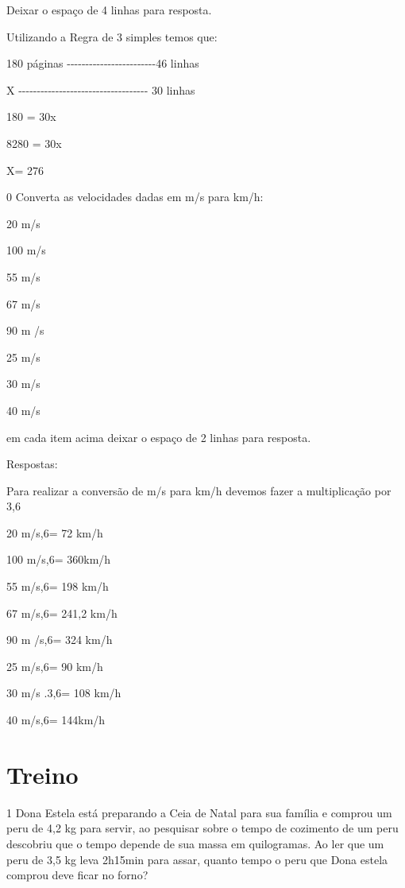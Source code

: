 Deixar o espaço de 4 linhas para resposta.

Utilizando a Regra de 3 simples temos que:

180 páginas
-\/-\/-\/-\/-\/-\/-\/-\/-\/-\/-\/-\/-\/-\/-\/-\/-\/-\/-\/-\/-\/-\/-\/-46
linhas

X
-\/-\/-\/-\/-\/-\/-\/-\/-\/-\/-\/-\/-\/-\/-\/-\/-\/-\/-\/-\/-\/-\/-\/-\/-\/-\/-\/-\/-\/-\/-\/-\/-\/-\/-
30 linhas

180 = 30\times x

8280 = 30x

X= 276

\num{0} Converta as velocidades dadas em m/s para km/h:

\item 20 m/s
\item 100 m/s
\item 55 m/s
\item 67 m/s
\item 90 m /s
\item 25 m/s
\item 30 m/s
\item 40 m/s

em cada item acima deixar o espaço de 2 linhas para resposta.

Respostas:

Para realizar a conversão de m/s para km/h devemos fazer a multiplicação
por 3,6

\item 20 m/s,6= 72 km/h
\item 100 m/s,6= 360km/h
\item 55 m/s,6= 198 km/h
\item 67 m/s,6= 241,2 km/h
\item 90 m /s,6= 324 km/h
\item 25 m/s,6= 90 km/h
\item 30 m/s .3,6= 108 km/h
\item 40 m/s,6= 144km/h

\section{Treino}

\num{1} Dona Estela está preparando a Ceia de Natal para sua família e
comprou um peru de 4,2 kg para servir, ao pesquisar sobre o tempo de
cozimento de um peru descobriu que o tempo depende de sua massa em
quilogramas. Ao ler que um peru de 3,5 kg leva 2h15min para assar,
quanto tempo o peru que Dona estela comprou deve ficar no forno?

